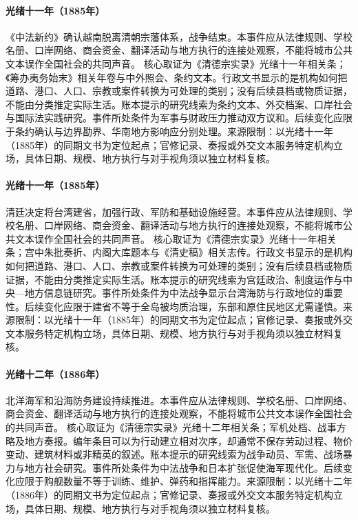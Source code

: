 \hypertarget{civic:EQ-1885-TIANJIN-CHINA-FRANCE-TREATY}{}\paragraph{光绪十一年（1885年）}《中法新约》确认越南脱离清朝宗藩体系，战争结束。本事件应从法律规则、学校名册、口岸网络、商会资金、翻译活动与地方执行的连接处观察，不能将城市公共文本误作全国社会的共同声音。 核心取证为《清德宗实录》光绪十一年相关条；《筹办夷务始末》相关年卷与中外照会、条约文本。行政文书显示的是机构如何把道路、港口、人口、宗教或案件转换为可处理的类别；没有后续县档或物质证据，不能由分类推定实际生活。账本提示的研究线索为条约文本、外交档案、口岸社会与国际法实践研究。事件所处条件为军事与财政压力推动双方议和。后续变化应限于条约确认与边界勘界、华南地方影响应分别处理。来源限制：以光绪十一年（1885年）的同期文书为定位起点；官修记录、奏报或外交文本服务特定机构立场，具体日期、规模、地方执行与对手视角须以独立材料复核。
\hypertarget{civic:EQ-1885-TAIWAN-PROVINCE}{}\paragraph{光绪十一年（1885年）}清廷决定将台湾建省，加强行政、军防和基础设施经营。本事件应从法律规则、学校名册、口岸网络、商会资金、翻译活动与地方执行的连接处观察，不能将城市公共文本误作全国社会的共同声音。 核心取证为《清德宗实录》光绪十一年相关条；宫中朱批奏折、内阁大库题本与《清史稿》相关志传。行政文书显示的是机构如何把道路、港口、人口、宗教或案件转换为可处理的类别；没有后续县档或物质证据，不能由分类推定实际生活。账本提示的研究线索为宫廷政治、制度运作与中央—地方信息链研究。事件所处条件为中法战争显示台湾海防与行政地位的重要性。后续变化应限于建省不等于全岛被均质治理，东部和原住民地区尤需谨慎。来源限制：以光绪十一年（1885年）的同期文书为定位起点；官修记录、奏报或外交文本服务特定机构立场，具体日期、规模、地方执行与对手视角须以独立材料复核。
\hypertarget{civic:EQ-1886-BEIYANG-NAVY-EXPANSION}{}\paragraph{光绪十二年（1886年）}北洋海军和沿海防务建设持续推进。本事件应从法律规则、学校名册、口岸网络、商会资金、翻译活动与地方执行的连接处观察，不能将城市公共文本误作全国社会的共同声音。 核心取证为《清德宗实录》光绪十二年相关条；军机处档、战事方略及地方奏报。编年条目可以为行动建立相对次序，却通常不保存劳动过程、物价变动、建筑材料或非精英的叙述。账本提示的研究线索为战争动员、军需、战场暴力与地方社会研究。事件所处条件为中法战争和日本扩张促使海军现代化。后续变化应限于购舰数量不等于训练、维护、弹药和指挥能力。来源限制：以光绪十二年（1886年）的同期文书为定位起点；官修记录、奏报或外交文本服务特定机构立场，具体日期、规模、地方执行与对手视角须以独立材料复核。
